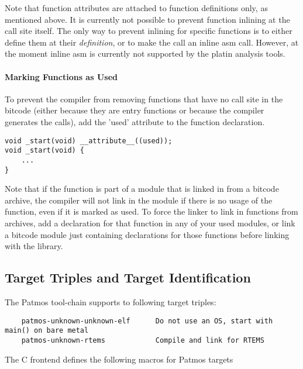 Note that function attributes are attached to function definitions only, as mentioned above.
It is currently not possible to prevent function inlining at the call site itself.
The only way to prevent inlining for specific functions is to either define them 
at their \emph{definition}, or to make the call an inline asm call. 
However, at the moment inline asm is currently not supported by the platin analysis tools. 


\paragraph{Marking Functions as Used}
To prevent the compiler from removing functions that have no call site in the bitcode
(either because they are entry functions or because the compiler generates the calls),
add the 'used' attribute to the function declaration.

\begin{verbatim}
void _start(void) __attribute__((used));
void _start(void) {
    ...
}
\end{verbatim}

Note that if the function is part of a module that is linked in from a bitcode archive,
the compiler will not link in the module if there is no usage of the function, even if it
is marked as used. To force the linker to link in functions from archives, add a declaration
for that function in any of your used modules, or link a bitcode module just containing declarations
for those functions before linking with the library.


\subsection{Target Triples and Target Identification}

The Patmos tool-chain supports to following target triples:

\begin{verbatim}
    patmos-unknown-unknown-elf      Do not use an OS, start with main() on bare metal
    patmos-unknown-rtems            Compile and link for RTEMS
\end{verbatim}

The C frontend defines the following macros for Patmos targets

